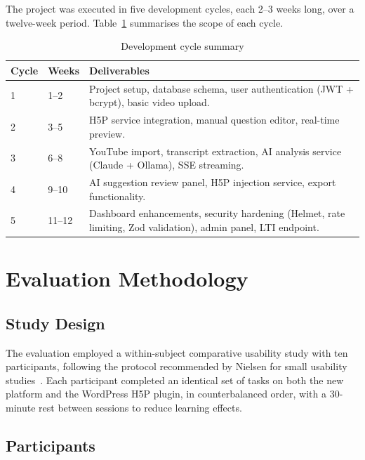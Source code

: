 The project was executed in five development cycles, each 2--3 weeks long,
over a twelve-week period. Table~\ref{tab:dev_cycles} summarises the scope
of each cycle.

\begin{table}[H]
  \centering
  \caption{Development cycle summary}
  \label{tab:dev_cycles}
  \begin{tabularx}{\linewidth}{llX}
    \toprule
    \textbf{Cycle} & \textbf{Weeks} & \textbf{Deliverables} \\
    \midrule
    1 & 1--2  & Project setup, database schema, user authentication (JWT + bcrypt), basic video upload. \\
    2 & 3--5  & H5P service integration, manual question editor, real-time preview. \\
    3 & 6--8  & YouTube import, transcript extraction, AI analysis service (Claude + Ollama), SSE streaming. \\
    4 & 9--10 & AI suggestion review panel, H5P injection service, export functionality. \\
    5 & 11--12 & Dashboard enhancements, security hardening (Helmet, rate limiting, Zod validation), admin panel, LTI endpoint. \\
    \bottomrule
  \end{tabularx}
\end{table}

\section{Evaluation Methodology}

\subsection{Study Design}

The evaluation employed a within-subject comparative usability study with
ten participants, following the protocol recommended by Nielsen for small
usability studies~\cite{nielsen1994}. Each participant completed an
identical set of tasks on both the new platform and the WordPress H5P
plugin, in counterbalanced order, with a 30-minute rest between sessions to
reduce learning effects.

\subsection{Participants}


